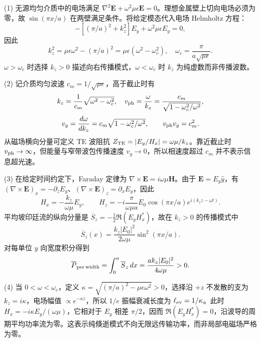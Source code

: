 (1) 无源均匀介质中的电场满足 \(\nabla^2\boldsymbol E+\omega^2\mu\epsilon\boldsymbol E=0\)。理想金属壁上切向电场必须为零，故 \(\sin(\pi x/a)\) 在两壁满足条件。将给定模态代入电场 Helmholtz 方程：
\[
-\left[(\pi/a)^2+k_z^2\right]E_y+\omega^2\mu\epsilon E_y=0,
\]
因此
\[
k_z^2=\mu\epsilon\omega^2-(\pi/a)^2
=\mu\epsilon(\omega^2-\omega_c^2),\quad
\omega_c=\frac{\pi}{a\sqrt{\mu\epsilon}}.
\]
\(\omega>\omega_c\) 时选择 \(k_z>0\) 描述向右传播模式，\(\omega<\omega_c\) 时 \(k_z\) 为纯虚数而非传播波数。

(2) 记介质均匀波速 \(c_m=1/\sqrt{\mu\epsilon}\)，高于截止时有
\[
k_z=\frac1{c_m}\sqrt{\omega^2-\omega_c^2},
\quad
v_{\rm ph}=\frac{\omega}{k_z}
=\frac{c_m}{\sqrt{1-\omega_c^2/\omega^2}},
\]
\[
v_g=\frac{d\omega}{dk_z}
=c_m\sqrt{1-\omega_c^2/\omega^2},\qquad
v_{\rm ph}v_g=c_m^2.
\]
从磁场横向分量可定义 TE 波阻抗 \(Z_{\rm TE}=|E_y/H_x|=\omega\mu/k_z\)。靠近截止时 \(v_{\rm ph}\to\infty\)，但能量与窄带波包传播速度 \(v_g\to0\)，所以相速度超过 \(c_m\) 并不表示信息超光速。

(3) 在给定时间约定下，Faraday 定律为 \(\nabla\times\boldsymbol E=i\omega\mu\boldsymbol H\)。由于 \(\boldsymbol E=E_y\hat y\)，有 \((\nabla\times\boldsymbol E)_x=-\partial_zE_y\)、\((\nabla\times\boldsymbol E)_z=\partial_xE_y\)，因此
\[
H_x=-\frac{k_z}{\omega\mu}E_y,\qquad
H_z=-i\frac{\pi}{\omega\mu a}E_0\cos(\pi x/a)e^{i(k_z z-\omega t)}.
\]
平均坡印廷流的纵向分量是 \(\overline S_z=-\frac12\Re(E_yH_x^*)\)，故在 \(k_z>0\) 的传播模式中
\[
\overline S_z(x)=\frac{k_z|E_0|^2}{2\omega\mu}\sin^2(\pi x/a).
\]
对每单位 \(y\) 向宽度积分得到
\[
\overline P_{\rm per\,width}
=\int_0^a\overline S_z\,dx
=\frac{ak_z|E_0|^2}{4\omega\mu}>0.
\]

(4) 当 \(0<\omega<\omega_c\)，定义 \(\kappa=\sqrt{(\pi/a)^2-\mu\epsilon\omega^2}>0\)，选择沿 \(+z\) 不发散的支为 \(k_z=i\kappa\)，电场幅值 \(\propto e^{-\kappa z}\)，所以 \(1/e\) 振幅衰减长度为 \(\ell_{\rm ev}=1/\kappa\)。此时 \(H_x=-i\kappa E_y/(\omega\mu)\)，它相对于 \(E_y\) 相差 \(\pi/2\)，因而 \(\Re(E_yH_x^*)=0\)，沿波导的周期平均功率流为零。这表示纯倏逝模式不向无限远传输功率，而非局部电磁场严格为零。
